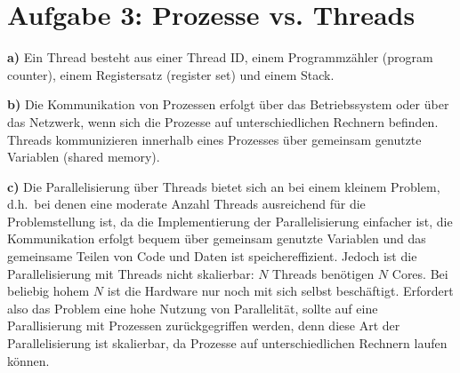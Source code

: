 \chapter{Aufgabe 3: Prozesse vs. Threads}

\textbf{a)} Ein Thread besteht aus einer Thread ID, einem Programmzähler (program counter), einem Registersatz (register set) und einem Stack.\medskip 

\textbf{b)} Die Kommunikation von Prozessen erfolgt über das Betriebssystem oder über das Netzwerk, wenn sich die Prozesse auf unterschiedlichen Rechnern befinden. Threads kommunizieren innerhalb eines Prozesses über gemeinsam genutzte Variablen (shared memory).\medskip 

\textbf{c)} Die Parallelisierung über Threads bietet sich an bei einem kleinem Problem, d.h.~bei denen eine moderate Anzahl Threads ausreichend für die Problemstellung ist, da die Implementierung der Parallelisierung einfacher ist, die Kommunikation erfolgt bequem über gemeinsam genutzte Variablen und das gemeinsame Teilen von Code und Daten ist speichereffizient. Jedoch ist die Parallelisierung mit Threads nicht skalierbar: $N$ Threads benötigen $N$ Cores. Bei beliebig hohem $N$ ist die Hardware nur noch mit sich selbst beschäftigt. Erfordert also das Problem eine hohe Nutzung von Parallelität, sollte auf eine Parallisierung mit Prozessen zurückgegriffen werden, denn diese Art der Parallelisierung ist skalierbar, da Prozesse auf unterschiedlichen Rechnern laufen können.